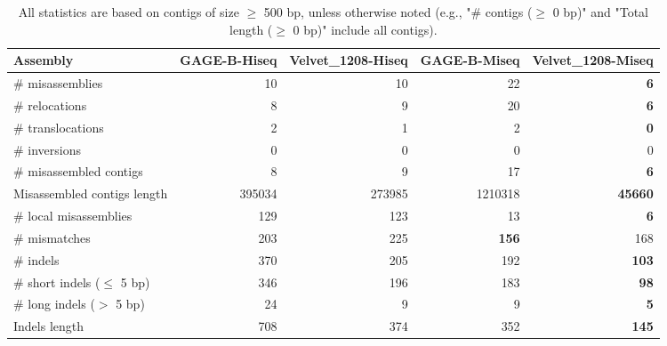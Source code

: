 \documentclass[12pt,a4paper]{article}
\begin{document}
\begin{table}[ht]
\begin{center}
\caption{All statistics are based on contigs of size $\geq$ 500 bp, unless otherwise noted (e.g., "\# contigs ($\geq$ 0 bp)" and "Total length ($\geq$ 0 bp)" include all contigs).}
\begin{tabular}{|l*{4}{|r}|}
\hline
Assembly & GAGE-B-Hiseq & Velvet\_1208-Hiseq & GAGE-B-Miseq & Velvet\_1208-Miseq \\ \hline
\# misassemblies & 10 & 10 & 22 & {\bf 6} \\ \hline
\hspace{5mm}\# relocations & 8 & 9 & 20 & {\bf 6} \\ \hline
\hspace{5mm}\# translocations & 2 & 1 & 2 & {\bf 0} \\ \hline
\hspace{5mm}\# inversions & 0 & 0 & 0 & 0 \\ \hline
\# misassembled contigs & 8 & 9 & 17 & {\bf 6} \\ \hline
Misassembled contigs length & 395034 & 273985 & 1210318 & {\bf 45660} \\ \hline
\# local misassemblies & 129 & 123 & 13 & {\bf 6} \\ \hline
\# mismatches & 203 & 225 & {\bf 156} & 168 \\ \hline
\# indels & 370 & 205 & 192 & {\bf 103} \\ \hline
\hspace{5mm}\# short indels ($\leq$ 5 bp) & 346 & 196 & 183 & {\bf 98} \\ \hline
\hspace{5mm}\# long indels ($>$ 5 bp) & 24 & 9 & 9 & {\bf 5} \\ \hline
Indels length & 708 & 374 & 352 & {\bf 145} \\ \hline
\end{tabular}
\end{center}
\end{table}
\end{document}
